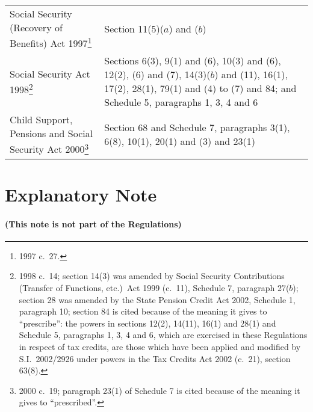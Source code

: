 \documentclass[12pt,a4paper]{article}
\begin{document}
{\begin{longtable}{p{94.09729pt}p{271.91016pt}}
Social Security (Recovery of Benefits) Act 1997\footnote{1997 c.\ 27.}	&Section 11(5)($a$)  and ($b$)\\ 
Social Security Act 1998\footnote{1998 c.\ 14; section 14(3) was amended by Social Security Contributions (Transfer of Functions, etc.)\ Act 1999 (c.\ 11), Schedule 7, paragraph 27($b$); section 28 was amended by the State Pension Credit Act 2002, Schedule 1, paragraph 10; section 84 is cited because of the meaning it gives to “prescribe”: the powers in sections 12(2), 14(11), 16(1) and 28(1) and Schedule 5, paragraphs 1, 3, 4 and 6, which are exercised in these Regulations in respect of tax credits, are those which have been applied and modified by S.I.\ 2002/2926 under powers in the Tax Credits Act 2002 (c.\ 21), section 63(8).}	&Sections 6(3), 9(1) and (6), 10(3) and (6), 12(2), (6) and (7), 14(3)($b$)  and (11), 16(1), 17(2), 28(1), 79(1) and (4) to (7) and 84; and Schedule 5, paragraphs 1, 3, 4 and 6\\
Child Support, Pensions and Social Security Act 2000\footnote{2000 c.\ 19; paragraph 23(1) of Schedule 7 is cited because of the meaning it gives to “prescribed”.}	&Section 68 and Schedule 7, paragraphs 3(1), 6(8), 10(1), 20(1) and (3) and 23(1)\\
\end{longtable}

}

\part{Explanatory Note}

\renewcommand\parthead{— Explanatory Note}

\subsection*{(This note is not part of the Regulations)}
\end{document}
